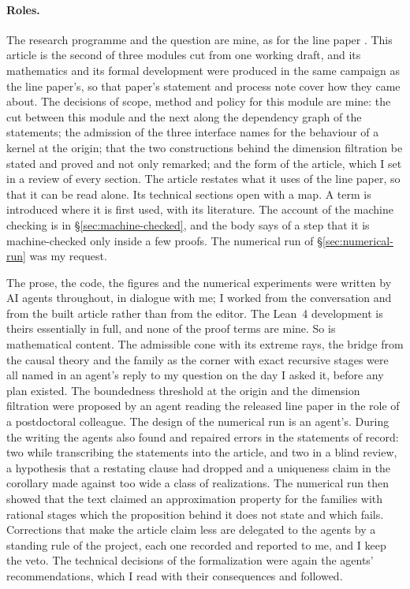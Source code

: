 \paragraph{Roles.} The research programme and the question are mine, as for the line paper
. This article is the second of three modules cut from one
working draft, and its mathematics and its formal development were produced in the same
campaign as the line paper's, so that paper's statement and process note cover how they came
about. The decisions of scope, method and policy for this module are mine: the cut between
this module and the next along the dependency graph of the statements; the admission of the
three interface names for the behaviour of a kernel at the origin; that the two constructions
behind the dimension filtration be stated and proved and not only remarked; and the form of
the article, which I set in a review of every section. The article restates what it uses of
the line paper, so that it can be read alone. Its technical sections open with a map. A term
is introduced where it is first used, with its literature. The account of the machine checking
is in \S\ref{sec:machine-checked}, and the body says of a step that it is machine-checked only
inside a few proofs. The numerical run of
\S\ref{sec:numerical-run} was my request.

The prose, the code, the figures and the numerical experiments were written by AI agents
throughout, in dialogue with me; I worked from the conversation and from the built article
rather than from the editor. The Lean~4 development is theirs essentially in full, and none of
the proof terms are mine. So is mathematical content. The admissible cone with its extreme
rays, the bridge from the causal theory and the \Matern{} family as the corner with exact
recursive stages were all named in an agent's reply to my question on the day I asked it,
before any plan existed. The boundedness threshold at the origin and the dimension filtration were proposed by
an agent reading the released line paper in the role of a postdoctoral colleague. The design of
the numerical run is an agent's. During the writing the agents also found and repaired errors
in the statements of record: two while transcribing the statements into the article, and two
in a blind review, a hypothesis that a restating clause had dropped and a uniqueness claim in
the \Matern{} corollary made against too wide a class of realizations. The numerical run then
showed that the text claimed an approximation property for the families with rational stages
which the proposition behind it does not state and which fails. Corrections that make the
article claim less are delegated to the agents by a standing rule of the project, each one
recorded and reported to me, and I keep the veto. The technical decisions of the formalization
were again the agents' recommendations, which I read with their consequences and followed.

